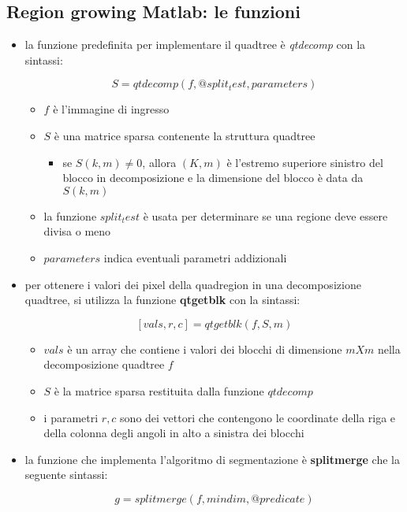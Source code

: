 \subsection{Region growing Matlab: le funzioni}
\begin{itemize}
\item la funzione predefinita per implementare il quadtree è \textit{qtdecomp} con la sintassi:

$$S = qtdecomp(f, @split_test, parameters)$$

\begin{itemize} 
\item $f$ è l'immagine di ingresso
\item $S$ è una matrice sparsa contenente la struttura quadtree

	\begin{itemize}
		\item se $S(k, m) \neq 0 $, allora $(K, m)$ è l'estremo superiore sinistro del blocco in decomposizione e la dimensione del blocco è data da $S(k, m)$
	\end{itemize}

\item la funzione $split_test$ è usata per determinare se una regione deve essere divisa o meno
\item $parameters$ indica eventuali parametri addizionali 
\end{itemize}
	
\item per ottenere i valori dei pixel della quadregion in una decomposizione quadtree, si utilizza la funzione \textbf{qtgetblk} con la sintassi:

$$[vals, r, c] = qtgetblk(f, S, m)$$

\begin{itemize}
	\item $vals$ è un array che contiene i valori dei blocchi di dimensione $mXm$ nella decomposizione quadtree $f$
	\item $S$ è la matrice sparsa restituita dalla funzione $qtdecomp$
	\item i parametri $r, c$ sono dei vettori che contengono le coordinate della riga e della colonna degli angoli in alto a sinistra dei blocchi
\end{itemize}

\item la funzione che implementa l'algoritmo di segmentazione è \textbf{splitmerge} che la seguente sintassi:

$$g = splitmerge(f, mindim, @predicate)$$


\end{itemize}

